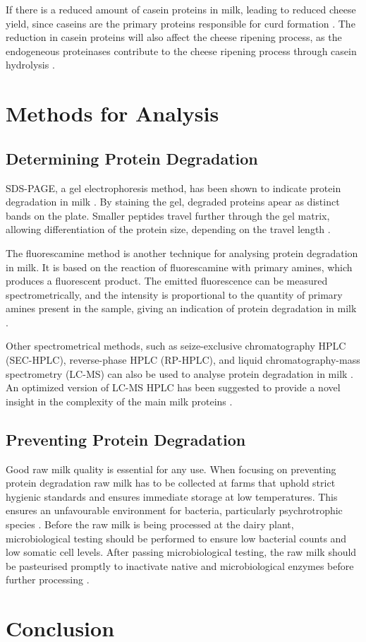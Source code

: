 If there is a reduced amount of casein proteins in milk, leading to reduced cheese yield, since caseins are the primary proteins responsible for curd formation \cite*{a02_proteases_and_protein_degradation}. The reduction in casein proteins will also affect the cheese ripening process, as the endogeneous proteinases contribute to the cheese ripening process through casein hydrolysis \cite*{a02_proteases_and_protein_degradation}.


\section{Methods for Analysis}

\subsection{Determining Protein Degradation}
SDS-PAGE, a gel electrophoresis method, has been shown to indicate protein degradation in milk \cite*{a02_proteases_and_protein_degradation}. By staining the gel, degraded proteins apear as distinct bands on the plate. Smaller peptides travel further through the gel matrix, allowing differentiation of the protein size, depending on the travel length  \cite*{a02_proteases_and_protein_degradation}.

The fluorescamine method is another technique for analysing protein degradation in milk. It is based on the reaction of fluorescamine with primary amines, which produces a fluorescent product. The emitted fluorescence can be measured spectrometrically, and the intensity is proportional to the quantity of primary amines present in the sample, giving an indication of protein degradation in milk \cite*{a02_proteases_and_protein_degradation}.

Other spectrometrical methods, such as seize-exclusive chromatography HPLC (SEC-HPLC), reverse-phase HPLC (RP-HPLC), and liquid chromatography-mass spectrometry (LC-MS) can also be used to analyse protein degradation in milk \cite*{s07_hplc_milk_components,a09_proteomics}. An optimized version of LC-MS HPLC has been suggested to provide a novel insight in the complexity of the main milk proteins \cite*{a09_proteomics}.

\subsection{Preventing Protein Degradation}
Good raw milk quality is essential for any use. When focusing on preventing protein degradation raw milk has to be collected at farms that uphold strict hygienic standards and ensures immediate storage at low temperatures. This ensures an unfavourable environment for bacteria, particularly psychrotrophic species \cite*{a08_shelf_life_of_heat_treated_dairy_products}. Before the raw milk is being processed at the dairy plant, microbiological testing should be performed to ensure low bacterial counts and low somatic cell levels. After passing microbiological testing, the raw milk should be pasteurised promptly to inactivate native and microbiological enzymes before further processing \cite*{a08_shelf_life_of_heat_treated_dairy_products}. 


\section{Conclusion}

